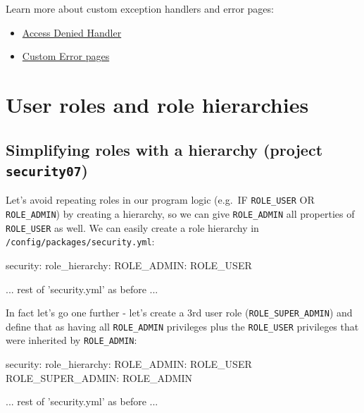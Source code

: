 \documentclass[a4paperpaper,openright]{book}
\newenvironment{Shaded}{}{}
\newcommand{\AttributeTok}[1]{\textcolor[rgb]{0.49,0.56,0.16}{#1}}
\newcommand{\FunctionTok}[1]{\textcolor[rgb]{0.02,0.16,0.49}{#1}}
\newcommand{\NormalTok}[1]{#1}
\newcommand{\StringTok}[1]{\textcolor[rgb]{0.25,0.44,0.63}{#1}}
\providecommand{\tightlist}{%
  \setlength{\itemsep}{0pt}\setlength{\parskip}{0pt}}
\begin{document}
Learn more about custom exception handlers and error pages:

\begin{itemize}
\tightlist
\item
  \href{https://symfony.com/doc/current/security/access_denied_handler.html}{Access
  Denied Handler}
\item
  \href{https://symfony.com/doc/current/controller/error_pages.html}{Custom
  Error pages}
\end{itemize}

\hypertarget{user-roles-and-role-hierarchies}{%
\chapter{User roles and role
hierarchies}\label{user-roles-and-role-hierarchies}}

\hypertarget{simplifying-roles-with-a-hierarchy-project-security07}{%
\section{\texorpdfstring{Simplifying roles with a hierarchy (project
\texttt{security07})}{Simplifying roles with a hierarchy (project security07)}}\label{simplifying-roles-with-a-hierarchy-project-security07}}

Let's avoid repeating roles in our program logic (e.g.~IF
\texttt{ROLE\_USER} OR \texttt{ROLE\_ADMIN}) by creating a hierarchy, so
we can give \texttt{ROLE\_ADMIN} all properties of \texttt{ROLE\_USER}
as well. We can easily create a role hierarchy in
\texttt{/config/packages/security.yml}:

\begin{Shaded}
\begin{Highlighting}[]
    \FunctionTok{security:}
        \FunctionTok{role_hierarchy:}
            \FunctionTok{ROLE_ADMIN:}\AttributeTok{       ROLE_USER}

\NormalTok{        ... rest of }\StringTok{'security.yml'}\NormalTok{ as before ...}
\end{Highlighting}
\end{Shaded}

In fact let's go one further - let's create a 3rd user role
(\texttt{ROLE\_SUPER\_ADMIN}) and define that as having all
\texttt{ROLE\_ADMIN} privileges plus the \texttt{ROLE\_USER} privileges
that were inherited by \texttt{ROLE\_ADMIN}:

\begin{Shaded}
\begin{Highlighting}[]
    \FunctionTok{security:}
        \FunctionTok{role_hierarchy:}
            \FunctionTok{ROLE_ADMIN:}\AttributeTok{       ROLE_USER}
            \FunctionTok{ROLE_SUPER_ADMIN:}\AttributeTok{ ROLE_ADMIN}

\NormalTok{        ... rest of }\StringTok{'security.yml'}\NormalTok{ as before ...}
\end{Highlighting}
\end{Shaded}
\end{document}
